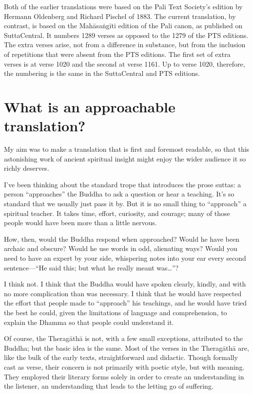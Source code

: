 \documentclass[10pt, openany]{book}
\begin{document}
Both of the earlier translations were based on the Pali Text Society’s edition by Hermann Oldenberg and Richard Pischel of 1883. The current translation, by contrast, is based on the Mahāsaṅgīti edition of the Pali canon, as published on SuttaCentral. It numbers 1289 verses as opposed to the 1279 of the PTS editions. The extra verses arise, not from a difference in substance, but from the inclusion of repetitions that were absent from the PTS editions. The first set of extra verses is at verse 1020 and the second at verse 1161. Up to verse 1020, therefore, the numbering is the same in the SuttaCentral and PTS editions.

\section*{What is an approachable translation?}

My aim was to make a translation that is first and foremost readable, so that this astonishing work of ancient spiritual insight might enjoy the wider audience it so richly deserves.

I’ve been thinking about the standard trope that introduces the prose suttas: a person “approaches” the Buddha to ask a question or hear a teaching. It’s so standard that we usually just pass it by. But it is no small thing to “approach” a spiritual teacher. It takes time, effort, curiosity, and courage; many of those people would have been more than a little nervous.

How, then, would the Buddha respond when approached? Would he have been archaic and obscure? Would he use words in odd, alienating ways? Would you need to have an expert by your side, whispering notes into your ear every second sentence—“He said this; but what he really meant was…”?

I think not. I think that the Buddha would have spoken clearly, kindly, and with no more complication than was necessary. I think that he would have respected the effort that people made to “approach” his teachings, and he would have tried the best he could, given the limitations of language and comprehension, to explain the Dhamma so that people could understand it.

Of course, the Theragāthā is not, with a few small exceptions, attributed to the Buddha; but the basic idea is the same. Most of the verses in the Thera\-gāthā are, like the bulk of the early texts, straightforward and didactic. Though formally cast as verse, their concern is not primarily with poetic style, but with meaning. They employed their literary forms solely in order to create an understanding in the listener, an understanding that leads to the letting go of suffering.
\end{document}
